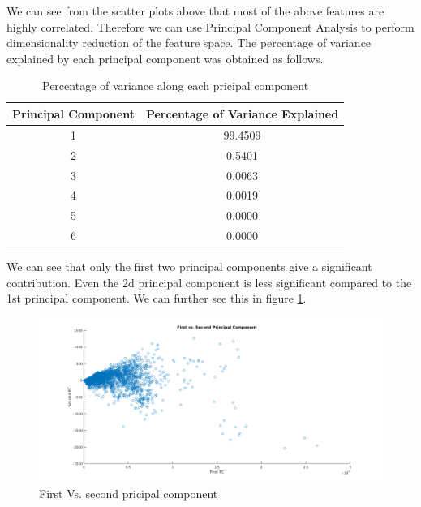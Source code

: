 \documentclass[12pt,a4paper]{report}
\begin{document}
We can see from the scatter plots above that most of the above features are highly correlated. Therefore we can use Principal Component Analysis to perform dimensionality reduction of the feature space. The percentage of variance explained by each principal component was obtained as follows.\\

\begin{table}[]
\centering
\caption{Percentage of variance along each pricipal component}
\label{pca-table}
\begin{tabular}{|c|c|}
\hline
\textbf{Principal Component} & \textbf{Percentage of Variance Explained} \\ \hline
1                            & 99.4509                                   \\ \hline
2                            & 0.5401                                    \\ \hline
3                            & 0.0063                                    \\ \hline
4                            & 0.0019                                    \\ \hline
5                            & 0.0000                                    \\ \hline
6                            & 0.0000                                    \\ \hline
\end{tabular}
\end{table}

We can see that only the first two principal components give a significant contribution. Even the 2d principal component is less significant compared to the 1st principal component. We can further see this in figure \ref{pca2}.

\begin{figure}[H]
\includegraphics[width=\textwidth]{pca/1_2_pca.png}
\centering
\caption{First Vs. second pricipal component}
\label{pca2}
\end{figure}
\end{document}
